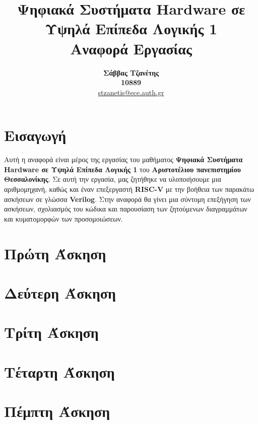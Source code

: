 \documentclass[a4paper,12pt]{report}
\def\tl{\textlatin}
\begin{document}
\title{\textbf{Ψηφιακά Συστήματα \tl{Hardware} σε Υψηλά Επίπεδα Λογικής 1} \\ Αναφορά Εργασίας}
\author{\textbf{Σάββας Τζανέτης} \\
\textbf{10889} \\
\href{mailto:empty@auth.gr}{\tl{stzanetis@ece.auth.gr}}}
\maketitle

\tableofcontents

\chapter*{Εισαγωγή}
    \large Αυτή η αναφορά είναι μέρος της εργασίας του μαθήματος \textbf{Ψηφιακά Συστήματα \tl{Hardware} σε Υψηλά
    Επίπεδα Λογικής 1} του \textbf{Αριστοτέλιου πανεπιστημίου Θεσσαλονίκης}. Σε αυτή την εργασία, μας ζητήθηκε
    να υλοποιήσουμε μια αριθμομηχανή, καθώς και έναν επεξεργαστή \textbf{\tl{RISC-V}} με την βοήθεια των παρακάτω
    ασκήσεων σε γλώσσα \textbf{\tl{Verilog}}. Στην αναφορά θα γίνει μια σύντομη επεξήγηση των ασκήσεων, σχολιασμός
    του κώδικα και παρουσίαση των ζητούμενων διαγραμμάτων και κυματομορφών των προσομοιώσεων.
\chapter{Πρώτη Άσκηση}
\chapter{Δεύτερη Άσκηση}
\chapter{Τρίτη Άσκηση}
\chapter{Τέταρτη Άσκηση}
\chapter{Πέμπτη Άσκηση}
\end{document}
